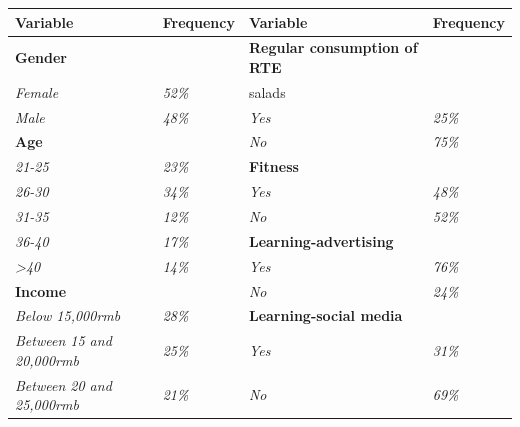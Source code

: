 \documentclass[12pt]{beamer}
\begin{document}
\begin{frame}
	\tiny
	\begin{table}[H]
		\begin{tabular}{l|l|l|l}
			\hline
			\textbf{Variable}                 & \textbf{Frequency} & \textbf{Variable}                              & \textbf{Frequency} \\ \hline
			\textbf{Gender}                   & \textit{}          & \textbf{Regular consumption of RTE}            & \textit{}          \\ \hline
			\textit{Female}                   & \textit{52\%}      & salads                                         & \textit{}          \\ \hline
			\textit{Male}                     & \textit{48\%}      & \textit{Yes}                                   & \textit{25\%}      \\ \hline
			\textbf{Age}                      & \textit{}          & \textit{No}                                    & \textit{75\%}      \\ \hline
			\textit{21-25}                    & \textit{23\%}      & \textbf{Fitness}                               & \textit{}          \\ \hline
			\textit{26-30}                    & \textit{34\%}      & \textit{Yes}                                   & \textit{48\%}      \\ \hline
			\textit{31-35}                    & \textit{12\%}      & \textit{No}                                    & \textit{52\%}      \\ \hline
			\textit{36-40}                    & \textit{17\%}      & \textbf{Learning-advertising}        &                    \\ \hline
			\textit{\textgreater{}40}         & \textit{14\%}      & \textit{Yes}                                   & \textit{76\%}      \\ \hline
			\textbf{Income}                   & \textit{}          & \textit{No}                                    & \textit{24\%}      \\ \hline
			\textit{Below 15,000rmb}          & \textit{28\%}      & \textbf{Learning-social media}       &                    \\ \hline
			\textit{Between 15 and 20,000rmb} & \textit{25\%}      & \textit{Yes}                                   & \textit{31\%}      \\ \hline
			\textit{Between 20 and 25,000rmb} & \textit{21\%}      & \textit{No}                                    & \textit{69\%}      \\ \hline

\end{tabular}
\end{table}
\end{frame}
\end{document}
